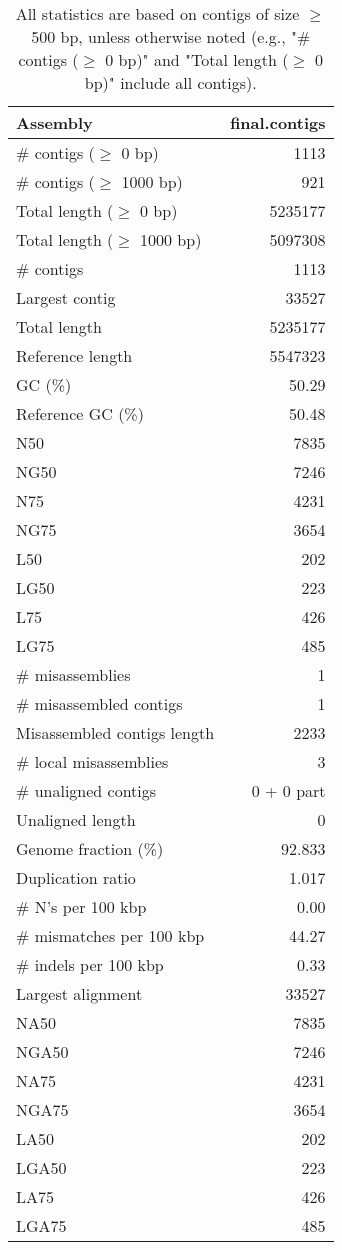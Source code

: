 \documentclass[12pt,a4paper]{article}
\begin{document}
\begin{table}[ht]
\begin{center}
\caption{All statistics are based on contigs of size $\geq$ 500 bp, unless otherwise noted (e.g., "\# contigs ($\geq$ 0 bp)" and "Total length ($\geq$ 0 bp)" include all contigs).}
\begin{tabular}{|l*{1}{|r}|}
\hline
Assembly & final.contigs \\ \hline
\# contigs ($\geq$ 0 bp) & 1113 \\ \hline
\# contigs ($\geq$ 1000 bp) & 921 \\ \hline
Total length ($\geq$ 0 bp) & 5235177 \\ \hline
Total length ($\geq$ 1000 bp) & 5097308 \\ \hline
\# contigs & 1113 \\ \hline
Largest contig & 33527 \\ \hline
Total length & 5235177 \\ \hline
Reference length & 5547323 \\ \hline
GC (\%) & 50.29 \\ \hline
Reference GC (\%) & 50.48 \\ \hline
N50 & 7835 \\ \hline
NG50 & 7246 \\ \hline
N75 & 4231 \\ \hline
NG75 & 3654 \\ \hline
L50 & 202 \\ \hline
LG50 & 223 \\ \hline
L75 & 426 \\ \hline
LG75 & 485 \\ \hline
\# misassemblies & 1 \\ \hline
\# misassembled contigs & 1 \\ \hline
Misassembled contigs length & 2233 \\ \hline
\# local misassemblies & 3 \\ \hline
\# unaligned contigs & 0 + 0 part \\ \hline
Unaligned length & 0 \\ \hline
Genome fraction (\%) & 92.833 \\ \hline
Duplication ratio & 1.017 \\ \hline
\# N's per 100 kbp & 0.00 \\ \hline
\# mismatches per 100 kbp & 44.27 \\ \hline
\# indels per 100 kbp & 0.33 \\ \hline
Largest alignment & 33527 \\ \hline
NA50 & 7835 \\ \hline
NGA50 & 7246 \\ \hline
NA75 & 4231 \\ \hline
NGA75 & 3654 \\ \hline
LA50 & 202 \\ \hline
LGA50 & 223 \\ \hline
LA75 & 426 \\ \hline
LGA75 & 485 \\ \hline
\end{tabular}
\end{center}
\end{table}
\end{document}
